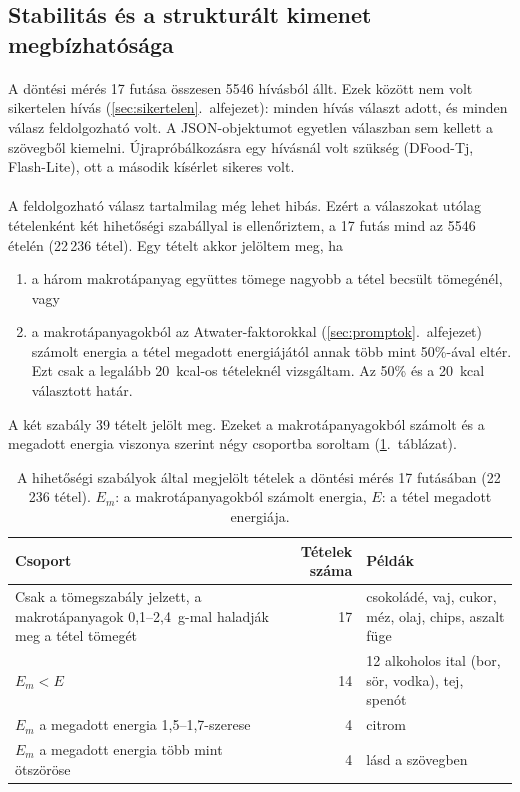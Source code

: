 \subsection{Stabilitás és a strukturált kimenet megbízhatósága}
\label{sec:stabilitas}
\paragraph{}A döntési mérés 17 futása összesen 5546 hívásból állt. Ezek között nem volt 
sikertelen hívás (\ref{sec:sikertelen}.~alfejezet): minden hívás választ adott, és minden 
válasz feldolgozható volt. A JSON-objektumot egyetlen válaszban sem kellett a szövegből 
kiemelni. Újrapróbálkozásra egy hívásnál volt szükség (DFood-Tj, Flash-Lite), ott a 
második kísérlet sikeres volt.

\paragraph{}A feldolgozható válasz tartalmilag még lehet hibás. Ezért a válaszokat utólag 
tételenként két hihetőségi szabállyal is ellenőriztem, a 17 futás mind az 5546 ételén 
(22\,236 tétel). Egy tételt akkor jelöltem meg, ha
\begin{enumerate}
    \item a három makrotápanyag együttes tömege nagyobb a tétel becsült tömegénél, vagy
    \item a makrotápanyagokból az Atwater-faktorokkal (\ref{sec:promptok}.~alfejezet) 
    számolt energia a tétel megadott energiájától annak több mint 50\%-ával eltér. Ezt 
    csak a legalább 20~kcal-os tételeknél vizsgáltam. Az 50\% és a 20~kcal választott határ.
\end{enumerate}
A két szabály 39 tételt jelölt meg. Ezeket a makrotápanyagokból számolt és a megadott 
energia viszonya szerint négy csoportba soroltam (\ref{tab:hihetoseg}.~táblázat).

\begin{table}[h]
\centering
\caption{A hihetőségi szabályok által megjelölt tételek a döntési mérés 17 futásában 
(22\,236 tétel). $E_m$: a makrotápanyagokból számolt energia, $E$: a tétel megadott 
energiája.}
\label{tab:hihetoseg}
\small
\begin{tabular}{p{6.0cm}rp{5.0cm}}
\hline
Csoport & Tételek száma & Példák \\
\hline
Csak a tömegszabály jelzett, a makrotápanyagok 0,1--2,4~g-mal haladják meg a tétel tömegét 
  & 17 & csokoládé, vaj, cukor, méz, olaj, chips, aszalt füge \\
$E_m < E$ & 14 & 12 alkoholos ital (bor, sör, vodka), tej, spenót \\
$E_m$ a megadott energia 1,5--1,7-szerese & 4 & citrom \\
$E_m$ a megadott energia több mint ötszöröse & 4 & lásd a szövegben \\
\hline
\end{tabular}
\end{table}

